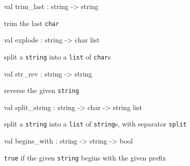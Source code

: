 \documentclass[11pt]{article}
\begin{document}
\label{val:Util.trim-underscorelast}\begin{ocamldoccode}
val trim_last : string -> string
\end{ocamldoccode}
\begin{ocamldocdescription}
trim the last {\tt{char}}


\end{ocamldocdescription}




\label{val:Util.explode}\begin{ocamldoccode}
val explode : string -> char list
\end{ocamldoccode}
\begin{ocamldocdescription}
split a {\tt{string}} into a {\tt{list}} of {\tt{char}}s


\end{ocamldocdescription}




\label{val:Util.str-underscorerev}\begin{ocamldoccode}
val str_rev : string -> string
\end{ocamldoccode}
\begin{ocamldocdescription}
reverse the given {\tt{string}}


\end{ocamldocdescription}




\label{val:Util.split-underscorestring}\begin{ocamldoccode}
val split_string : string -> char -> string list
\end{ocamldoccode}
\begin{ocamldocdescription}
split a {\tt{string}} into a {\tt{list}} of {\tt{string}}s, with separator {\tt{split}}


\end{ocamldocdescription}




\label{val:Util.begins-underscorewith}\begin{ocamldoccode}
val begins_with : string -> string -> bool
\end{ocamldoccode}
\begin{ocamldocdescription}
{\tt{true}} if the given {\tt{string}} begins with the given prefix


\end{ocamldocdescription}
\end{document}
